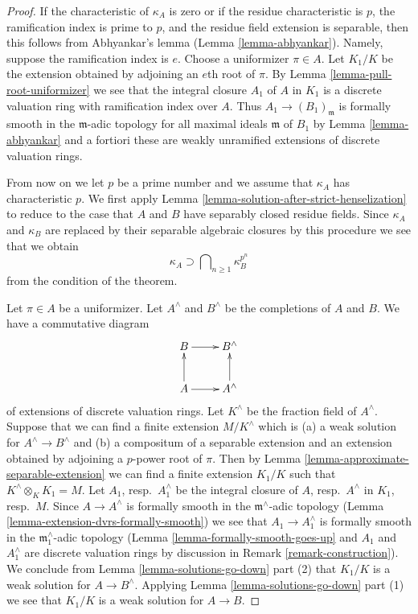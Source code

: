 \documentclass[10pt,a4paper]{amsart}
\theoremstyle{plain}
\theoremstyle{definition}
\theoremstyle{remark}
\numberwithin{equation}{subsection}
\begin{document}
\begin{proof}
If the characteristic of $\kappa_A$ is zero or if the residue characteristic
is $p$, the ramification index is prime to $p$, and the residue field
extension is separable, then this follows from Abhyankar's lemma
(Lemma \ref{lemma-abhyankar}). Namely, suppose the ramification index
is $e$. Choose a uniformizer $\pi \in A$. Let $K_1/K$
be the extension obtained by adjoining an $e$th root of $\pi$.
By Lemma \ref{lemma-pull-root-uniformizer} we see that the integral
closure $A_1$ of $A$ in $K_1$ is a discrete valuation ring with
ramification index over $A$. Thus $A_1 \to (B_1)_\mathfrak m$
is formally smooth in the $\mathfrak m$-adic topology
for all maximal ideals $\mathfrak m$ of $B_1$
by Lemma \ref{lemma-abhyankar} and a fortiori these are weakly
unramified extensions of discrete valuation rings.

\medskip\noindent
From now on we let $p$ be a prime number and we assume that $\kappa_A$ has
characteristic $p$. We first apply
Lemma \ref{lemma-solution-after-strict-henselization}
to reduce to the case that $A$ and $B$ have separably closed residue fields.
Since $\kappa_A$ and $\kappa_B$ are replaced by their separable algebraic
closures by this procedure we see that we obtain
$$
\kappa_A \supset \bigcap\nolimits_{n \geq 1} \kappa_B^{p^n}
$$
from the condition of the theorem.

\medskip\noindent
Let $\pi \in A$ be a uniformizer. Let $A^\wedge$ and $B^\wedge$ be the
completions of $A$ and $B$. We have a commutative diagram
$$
\xymatrix{
B \ar[r] & B^\wedge \\
A \ar[u] \ar[r] & A^\wedge \ar[u]
}
$$
of extensions of discrete valuation rings. Let $K^\wedge$ be the fraction
field of $A^\wedge$. Suppose that we can find a finite extension
$M/K^\wedge$ which is (a) a weak solution for $A^\wedge \to B^\wedge$
and (b) a compositum of a separable extension and an extension obtained
by adjoining a $p$-power root of $\pi$. Then by
Lemma \ref{lemma-approximate-separable-extension}
we can find a finite extension $K_1/K$ such that
$K^\wedge \otimes_K K_1 = M$. Let $A_1$, resp.\ $A_1^\wedge$
be the integral closure of $A$, resp.\ $A^\wedge$ in $K_1$, resp.\ $M$.
Since $A \to A^\wedge$ is formally smooth in the $\mathfrak m^\wedge$-adic
topology
(Lemma \ref{lemma-extension-dvrs-formally-smooth})
we see that $A_1 \to A_1^\wedge$ is formally smooth in the
$\mathfrak m_1^\wedge$-adic topology
(Lemma \ref{lemma-formally-smooth-goes-up} and
$A_1$ and $A_1^\wedge$ are discrete valuation
rings by discussion in Remark \ref{remark-construction}).
We conclude from Lemma \ref{lemma-solutions-go-down} part (2)
that $K_1/K$ is a weak solution for $A \to B^\wedge$.
Applying Lemma \ref{lemma-solutions-go-down} part (1)
we see that $K_1/K$ is a weak solution for $A \to B$.


\end{proof}
\end{document}
